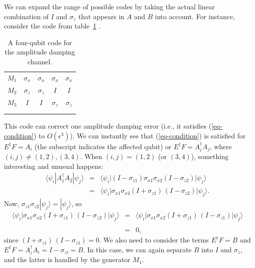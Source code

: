 \documentclass{report}
\newcommand{\ket}[1]{|{#1}\rangle}
\newcommand{\bra}[1]{\langle{#1}|}
\newcommand{\X}{\sigma_x}
\newcommand{\Z}{\sigma_z}
\newcommand{\Xs}[1]{\sigma_{x{#1}}}
\newcommand{\Zs}[1]{\sigma_{z{#1}}}
\newcommand{\Xbar}{\overline{X}}
\newcommand{\Zbar}{\overline{Z}}
\newcommand{\low}[1]{\raisebox{-0.3ex}{{#1}}}
\begin{document}
We can expand the range of possible codes by taking the actual linear 
combination of $I$ and $\Z$ that appears in $A$ and $B$ into account.  For
instance, consider the code from table~\ref{table-amplitude} \cite{leung}.
\begin{table}
\centering
\begin{tabular}{c|cccc}
$M_1$ & $\X$ & $\X$ & $\X$ & $\X$ \\
$M_2$ & $\Z$ & $\Z$ & $I$ & $I$ \\
$M_3$ & $I$ & $I$ & $\Z$ & $\Z$ \\
\hline
\low{$\Xbar$} & \low{$\X$} & \low{$\X$} & \low{$I$} & \low{$I$} \\
\low{$\Zbar$} & \low{$\Z$} & \low{$I$} & \low{$\Z$} & \low{$I$}
\end{tabular}
\caption{A four-qubit code for the amplitude damping channel.}
\label{table-amplitude}
\end{table}
This code can correct one amplitude damping error (i.e., it satisfies
(\ref{eq-condition}) to $O(\epsilon^3)$).  We can instantly see that
(\ref{eq-condition}) is satisfied for $E^\dagger F = A_i$ (the subscript
indicates the affected qubit) or $E^\dagger F = A_i^\dagger A_j$, where
$(i, j) \neq (1, 2), (3, 4)$.  When $(i, j) = (1,2)$ (or $(3,4)$), something
interesting and unusual happens:
\begin{eqnarray}
\bra{\psi_i} A_1^\dagger A_2 \ket{\psi_j} & = & 
\bra{\psi_i} (I - \Zs{1}) \Xs{1} \Xs{2} (I - \Zs{2}) \ket{\psi_j} \\
& = & \bra{\psi_i} \Xs{1} \Xs{2} (I + \Zs{1})\,(I - \Zs{2}) \ket{\psi_j}.
\end{eqnarray}
Now, $\Zs{1} \Zs{2} \ket{\psi_j} = \ket{\psi_j}$, so
\begin{eqnarray}
\bra{\psi_i} \Xs{1} \Xs{2} (I + \Zs{1})\,(I - \Zs{2}) \ket{\psi_j}
& = & \bra{\psi_i} \Xs{1} \Xs{2} (I + \Zs{1})\,(I - \Zs{1}) \ket{\psi_j} 
\nonumber \\
\\
& = & 0,
\end{eqnarray}
since $(I + \Zs{1})\,(I - \Zs{1}) = 0$.  We also need to consider the terms
$E^\dagger F = B$ and $E^\dagger F = A_i^\dagger A_i = I - \Zs{i} = B$.  In
this case, we can again separate $B$ into $I$ and $\Z$, and the latter is
handled by the generator $M_1$.
\end{document}
